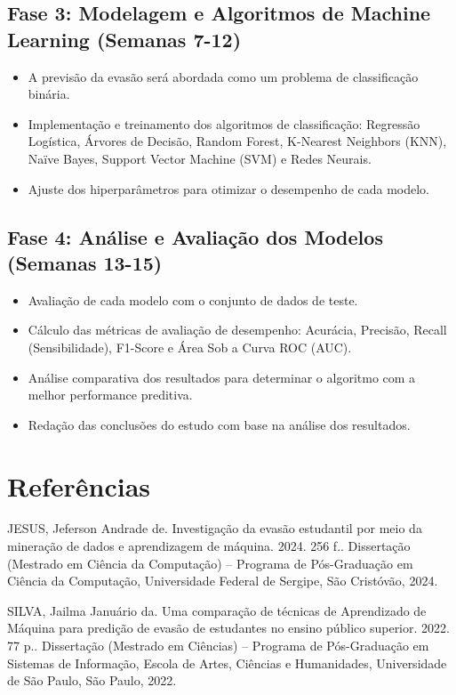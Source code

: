 \documentclass[english, spanish, brazilian]{RBIEarticle} %
\begin{document}
\subsection{Fase 3: Modelagem e Algoritmos de Machine Learning (Semanas 7-12)}

\begin{itemize}
    \item A previsão da evasão será abordada como um problema de classificação binária.
    \item Implementação e treinamento dos algoritmos de classificação: Regressão Logística, Árvores de Decisão, Random Forest, K-Nearest Neighbors (KNN), Naïve Bayes, Support Vector Machine (SVM) e Redes Neurais.
    \item Ajuste dos hiperparâmetros para otimizar o desempenho de cada modelo.
\end{itemize}


\subsection{Fase 4: Análise e Avaliação dos Modelos (Semanas 13-15)}

\begin{itemize}
    \item Avaliação de cada modelo com o conjunto de dados de teste.
    \item Cálculo das métricas de avaliação de desempenho: Acurácia, Precisão, Recall (Sensibilidade), F1-Score e Área Sob a Curva ROC (AUC).
    \item Análise comparativa dos resultados para determinar o algoritmo com a melhor performance preditiva.
    \item Redação das conclusões do estudo com base na análise dos resultados.
\end{itemize}


\section*{Referências}
JESUS, Jeferson Andrade de. Investigação da evasão estudantil por meio da mineração de dados e aprendizagem de máquina. 2024. 256 f.. Dissertação (Mestrado em Ciência da Computação) – Programa de Pós-Graduação em Ciência da Computação, Universidade Federal de Sergipe, São Cristóvão, 2024.

SILVA, Jailma Januário da. Uma comparação de técnicas de Aprendizado de Máquina para predição de evasão de estudantes no ensino público superior. 2022. 77 p.. Dissertação (Mestrado em Ciências) – Programa de Pós-Graduação em Sistemas de Informação, Escola de Artes, Ciências e Humanidades, Universidade de São Paulo, São Paulo, 2022.
\end{document}
